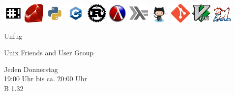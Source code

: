 \begin{frame}
\begin{center}
        \includegraphics[width=0.075\textwidth]{img/bash.png}
        \includegraphics[width=0.075\textwidth]{img/ruby.png}
        \includegraphics[width=0.075\textwidth]{img/python.png}
        \includegraphics[width=0.075\textwidth]{img/cpp.png}
        \includegraphics[width=0.075\textwidth]{img/rust.png}
        \includegraphics[width=0.075\textwidth]{img/racket.png}
        \includegraphics[width=0.075\textwidth]{img/haskell.png}
        \includegraphics[width=0.075\textwidth]{img/github.png}
        \includegraphics[width=0.075\textwidth]{img/git.png}
        \includegraphics[width=0.075\textwidth]{img/vim.png}
        \includegraphics[width=0.075\textwidth]{img/emacs.png}

        \huge{Unfug

            Unix Friends and User Group

            Jeden Donnerstag
            \\

            19:00 Uhr bis ca. 20:00 Uhr
            \\

            B 1.32
        }

    \end{center}

\end{frame}
